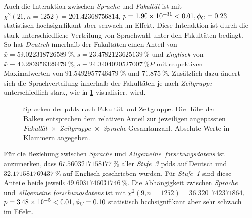 Auch die Interaktion zwischen \textit{Sprache} und \textit{Fakultät} ist mit $\chi^2 (\num{21}, n=\num{1252}) = \num[round-mode=places,round-precision=2]{201.42368756814}$, $p = \num[round-mode=places,round-precision=2]{1.90053471088499E-31}<\num{0.01},\phi_C=\num[round-mode=places,round-precision=2]{0.231575430181447}$ statistisch hochsignifikant aber schwach im Effekt.
Diese Interaktion ist durch die stark unterschiedliche Verteilung von Sprachwahl unter den Fakultäten bedingt.
So hat \textit{Deutsch} innerhalb der Fakultäten einen Anteil von $\bar{x}=\SI[round-mode=places,round-precision=2]{59.022318726589}{\percent},s=\SI[round-mode=places,round-precision=2]{23.4782123625139}{\percent}$ und \textit{Englisch} von $\bar{x}=\SI[round-mode=places,round-precision=2]{40.283956329479}{\percent},s=\SI[round-mode=places,round-precision=2]{24.3404020527007}{\percent P}$ mit respektiven Maximalwerten von $\SI[round-mode=places,round-precision=2]{91.5492957746479}{\percent}$ und $\SI[round-mode=places,round-precision=2]{71.875}{\percent}$.
Zusätzlich dazu ändert sich die Sprachverteilung innerhalb der Fakultäten je nach \textit{Zeitgruppe} unterschiedlich stark, wie in \cref{fig:luh-repo_sprache_x_fakultät_x_zeitgruppe} visualisiert wird.
\begin{figure}[!htbp]
    \resizebox{\ifdim\width>\textwidth\textwidth\else\width\fi}{!}{}
    \caption{Sprachen der \glspl{pdd} nach Fakultät und Zeitgruppe.
    Die Höhe der Balken entsprechen dem relativen Anteil zur jeweiligen angepassten \textit{Fakultät}~$\times$~\textit{Zeitgruppe}~$\times$~\textit{Sprache}-Gesamtanzahl.
    Absolute Werte in Klammern angegeben.}
    \label{fig:luh-repo_sprache_x_fakultät_x_zeitgruppe}
\end{figure}

Für die Beziehung zwischen \textit{Sprache} und \textit{Allgemeine~\glspl{forschungsdaten}} ist anzumerken, dass $\SI[round-mode=places,round-precision=2]{67.5603217158177}{\percent}$ aller \textit{Stufe~3} \glspl{pdd} auf Deutsch und $\SI[round-mode=places,round-precision=2]{32.171581769437}{\percent}$ auf Englisch geschrieben wurden.
Für \textit{Stufe~1} sind diese Anteile beide jeweils $\SI[round-mode=places,round-precision=2]{49.6031746031746}{\percent}$.
Die Abhängigkeit zwischen \textit{Sprache} und \textit{Allgemeine \glspl{forschungsdaten}} ist mit $\chi^2 (\num{9}, n=\num{1252}) = \num[round-mode=places,round-precision=2]{36.3201742371864}$, $p = \num[round-mode=places,round-precision=2]{3.47809061239522E-05}<\num{0.01},\phi_C=\num[round-mode=places,round-precision=2]{0.0983356900818459}$ statistisch hochsignifikant aber sehr schwach im Effekt.

